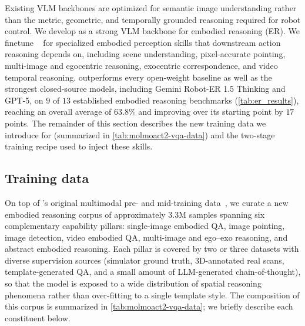 Existing VLM backbones are optimized for semantic image understanding rather than the metric, geometric, and temporally grounded reasoning required for robot control.
We develop \molmoer as a strong VLM backbone for embodied reasoning (ER). 
We finetune \molmot~\citep{clark2026molmo2openweightsdata} for specialized embodied perception skills that downstream action reasoning depends on, including scene understanding, pixel-accurate pointing, multi-image and egocentric reasoning, exocentric correspondence, and video temporal reasoning. 
\molmoer outperforms every open-weight baseline as well as the strongest closed-source models, including Gemini Robot-ER 1.5 Thinking and GPT-5, on $9$ of $13$ established embodied reasoning benchmarks (\autoref{tab:er_results}), reaching an overall average of $63.8\%$ and improving over its \molmot starting point by $17$ points. The remainder of this section describes the new training data we introduce for \molmoer (summarized in \autoref{tab:molmoact2-vqa-data}) and the two-stage training recipe used to inject these skills.

\subsection{Training data}
\label{sec:molmoer-data}

On top of \molmot's original multimodal pre- and mid-training data~\citep{clark2026molmo2openweightsdata}, we curate a new embodied reasoning corpus of approximately $3.3$M samples spanning six complementary capability pillars: single-image embodied QA, image pointing, image detection, video embodied QA, multi-image and ego--exo reasoning, and abstract embodied reasoning. Each pillar is covered by two or three datasets with diverse supervision sources (simulator ground truth, 3D-annotated real scans, template-generated QA, and a small amount of LLM-generated chain-of-thought), so that the model is exposed to a wide distribution of spatial reasoning phenomena rather than over-fitting to a single template style. The composition of this corpus is summarized in \autoref{tab:molmoact2-vqa-data}; we briefly describe each constituent below.

